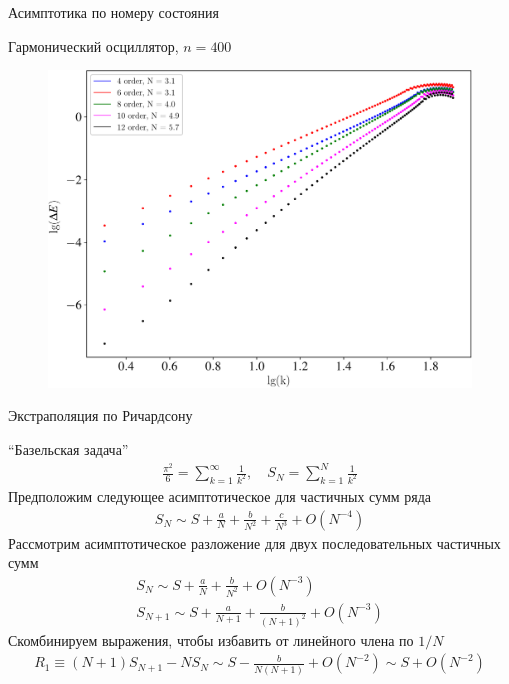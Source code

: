 \documentclass[10pt,pdf,hyperref={unicode},xcolor=dvipsnames]{beamer}
\begin{document}
\begin{frame}{Асимптотика по номеру состояния}
    \vspace*{-0.5cm}
    \begin{block}{Гармонический осциллятор, $n = 400$}
        \begin{figure}[H]
            \includegraphics[width=0.8\linewidth]{./pictures/diff_k_nonlinear-crop.pdf}
        \end{figure}
    \end{block}
\end{frame}

\begin{frame}{Экстраполяция по Ричардсону}
    \vspace*{-0.5cm}
    \begin{block}{\enquote{Базельская задача}}
        \vspace*{-0.5cm}
        \begin{gather}
            \frac{\pi^2}{6} = \sum_{k=1}^\infty \frac{1}{k^2}, \quad S_N = \sum_{k=1}^N \frac{1}{k^2}
        \end{gather}
        Предположим следующее асимптотическое для частичных сумм ряда
        \begin{gather}
            S_N \sim S + \frac{a}{N} + \frac{b}{N^2} + \frac{c}{N^3} + O(N^{-4}) 
        \end{gather}
        Рассмотрим асимптотическое разложение для двух последовательных частичных сумм
        \begin{gather}
            S_N \sim S + \frac{a}{N} + \frac{b}{N^2} + O(N^{-3}) \\
            S_{N+1} \sim S + \frac{a}{N+1} + \frac{b}{(N+1)^2} + O(N^{-3})
        \end{gather}
        Скомбинируем выражения, чтобы избавить от линейного члена по $1/N$
        \begin{gather}
            R_1 \equiv (N+1) S_{N+1} - N S_N \sim S - \frac{b}{N(N+1)} + O(N^{-2}) \sim S + O(N^{-2}) 
        \end{gather}
    \end{block}
\end{frame}
\end{document}
